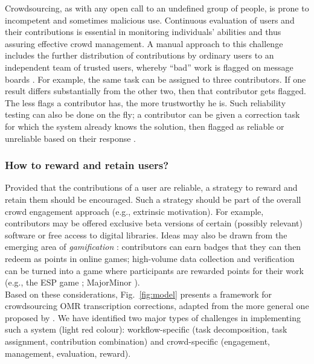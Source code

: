 \documentclass[letterpaper,10pt,pagesize=pdftex,headings=normal]{scrreprt}
\begin{document}
Crowdsourcing, as with any open call to an undefined group of people, is prone to incompetent and sometimes malicious use. Continuous evaluation of users and their contributions is essential in monitoring individuals' abilities and thus assuring effective crowd management. A manual approach to this challenge includes the further distribution of contributions by ordinary users to an independent team of trusted users, whereby ``bad'' work is flagged on message boards \citep{doan2011}. For example, the same task can be assigned to three contributors. If one result differs substantially from the other two, then that contributor gets flagged. The less flags a contributor has, the more trustworthy he is. Such reliability testing can also be done on the fly; a contributor can be given a correction task for which the system already knows the solution, then flagged as reliable or unreliable based on their response \citep{doan2011}.    

\subsubsection*{How to reward and retain users?}

Provided that the contributions of a user are reliable, a strategy to reward and retain them should be encouraged. Such a strategy should be part of the overall crowd engagement approach (e.g., extrinsic motivation). For example, contributors may be offered exclusive beta versions of certain (possibly relevant) software or free access to digital libraries. Ideas may also be drawn from the emerging area of \emph{gamification} \citep{deterding2011}: contributors can earn badges that they can then redeem as points in online games; high-volume data collection and verification can be turned into a game where participants are rewarded points for their work (e.g., the ESP game \citep{ahn2004}; MajorMinor \citep{mandel2008}). \\

\noindent Based on these considerations, Fig.~\ref{fig:model} presents a framework for crowdsourcing OMR transcription corrections, adapted from the more general one proposed by \citet[Fig.~2]{kittur2013}. We have identified two major types of challenges in implementing such a system (light red colour): workflow-specific (task decomposition, task assignment, contribution combination) and crowd-specific (engagement, management, evaluation, reward).
\end{document}
